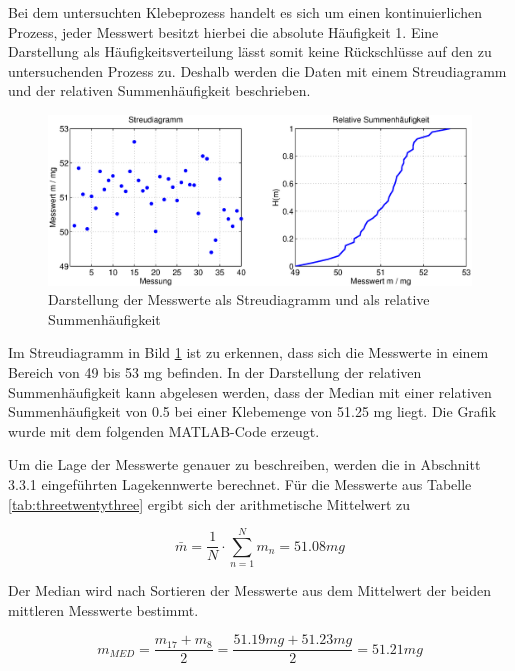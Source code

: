 \noindent Bei dem untersuchten Klebeprozess handelt es sich um einen kontinuierlichen Prozess, jeder Messwert besitzt hierbei die absolute H\"{a}ufigkeit 1. Eine Darstellung als H\"{a}ufigkeitsverteilung l\"{a}sst somit keine R\"{u}ckschl\"{u}sse auf den zu untersuchenden Prozess zu. Deshalb werden die Daten mit einem Streudiagramm und der relativen Summenh\"{a}ufigkeit beschrieben.

\begin{figure}[H]
  \centerline{\includegraphics[width=1\textwidth]{Kapitel3/Bilder/image14}}
  \caption{Darstellung der Messwerte als Streudiagramm und als relative Summenh\"{a}ufigkeit}
  \label{fig:Streudiagramm}
\end{figure}

\noindent Im Streudiagramm in Bild \ref{fig:Streudiagramm} ist zu erkennen, dass sich die Messwerte in einem Bereich von 49 bis 53 mg befinden. In der Darstellung der relativen Summenh\"{a}ufigkeit kann abgelesen werden, dass der Median mit einer relativen Summenh\"{a}ufigkeit von 0.5 bei einer Klebemenge von 51.25 mg liegt. Die Grafik wurde mit dem folgenden MATLAB-Code erzeugt.

\clearpage



\noindent Um die Lage der Messwerte genauer zu beschreiben, werden die in Abschnitt 3.3.1 eingef\"{u}hrten Lagekennwerte berechnet. F\"{u}r die Messwerte aus Tabelle \ref{tab:threetwentythree} ergibt sich der arithmetische Mittelwert zu

\begin{equation}\label{eq:threesixtyeight}
\bar{m}=\dfrac{1}{N} \cdot \sum _{n=1}^{N}m_{n}  =51.08 mg
\end{equation}

\noindent Der Median wird nach Sortieren der Messwerte aus dem Mittelwert der beiden mittleren Messwerte bestimmt.

\begin{equation}\label{eq:threesixtynine}
m_{MED} =\dfrac{m_{17} +m_{8} }{2} =\dfrac{51.19 mg + 51.23 mg}{2} =51.21mg
\end{equation}

